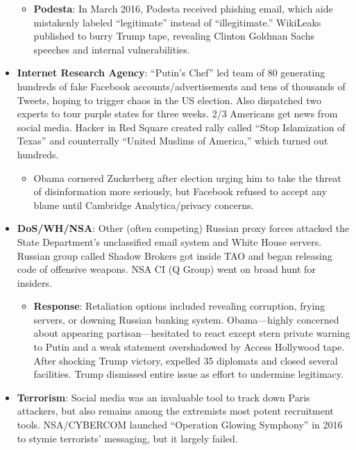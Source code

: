 \documentclass[
]{article}
\providecommand{\tightlist}{%
  \setlength{\itemsep}{0pt}\setlength{\parskip}{0pt}}
\begin{document}
\begin{itemize}
  \begin{itemize}
  \tightlist
  \item
    \textbf{Podesta}: In March 2016, Podesta received phishing email,
    which aide mistakenly labeled ``legitimate'' instead of
    ``illegitimate.'' WikiLeaks published to burry Trump tape, revealing
    Clinton Goldman Sachs speeches and internal vulnerabilities.
  \end{itemize}
\item
  \textbf{Internet Research Agency}: ``Putin's Chef'' led team of 80
  generating hundreds of fake Facebook accounts/advertisements and tens
  of thousands of Tweets, hoping to trigger chaos in the US election.
  Also dispatched two experts to tour purple states for three weeks. 2/3
  Americans get news from social media. Hacker in Red Square created
  rally called ``Stop Islamization of Texas'' and counterrally ``United
  Muslims of America,'' which turned out hundreds.

  \begin{itemize}
  \tightlist
  \item
    Obama cornered Zuckerberg after election urging him to take the
    threat of disinformation more seriously, but Facebook refused to
    accept any blame until Cambridge Analytica/privacy concerns.
  \end{itemize}
\item
  \textbf{DoS/WH/NSA}: Other (often competing) Russian proxy forces
  attacked the State Department's unclassified email system and White
  House servers. Russian group called Shadow Brokers got inside TAO and
  began releasing code of offensive weapons. NSA CI (Q Group) went on
  broad hunt for insiders.

  \begin{itemize}
  \tightlist
  \item
    \textbf{Response}: Retaliation options included revealing
    corruption, frying servers, or downing Russian banking system.
    Obama---highly concerned about appearing partisan---hesitated to
    react except stern private warning to Putin and a weak statement
    overshadowed by Access Hollywood tape. After shocking Trump victory,
    expelled 35 diplomats and closed several facilities. Trump dismissed
    entire issue as effort to undermine legitimacy.
  \end{itemize}
\item
  \textbf{Terrorism}: Social media was an invaluable tool to track down
  Paris attackers, but also remains among the extremists most potent
  recruitment tools. NSA/CYBERCOM launched ``Operation Glowing
  Symphony'' in 2016 to stymie terrorists' messaging, but it largely
  failed.
\end{itemize}
\end{document}
